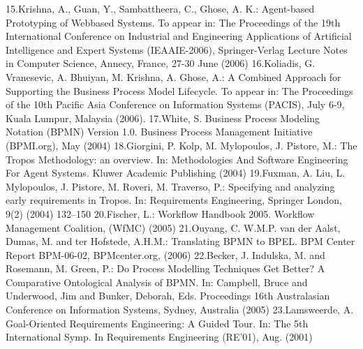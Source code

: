 15.Krishna, A., Guan, Y., Sambattheera, C., Ghose, A. K.: Agent-based Prototyping of Webbased Systems. To appear in: The Proceedings of the 19th International Conference on Industrial and Engineering Applications of Artificial Intelligence and Expert Systems (IEAAIE-2006), Springer-Verlag Lecture Notes in Computer Science, Annecy, France, 27-30
June (2006)
16.Koliadis, G. Vranesevic, A. Bhuiyan, M. Krishna, A. Ghose, A.: A Combined Approach for
Supporting the Business Process Model Lifecycle. To appear in: The Proceedings of the
10th Pacific Asia Conference on Information Systems (PACIS), July 6-9, Kuala Lumpur,
Malaysia (2006).
17.White, S. Business Process Modeling Notation (BPMN) Version 1.0. Business Process
Management Initiative (BPMI.org), May (2004)
18.Giorgini, P. Kolp, M. Mylopoulos, J. Pistore, M.: The Tropos Methodology: an overview.
In: Methodologies And Software Engineering For Agent Systems. Kluwer Academic Publishing (2004)
19.Fuxman, A. Liu, L. Mylopoulos, J. Pistore, M. Roveri, M. Traverso, P.: Specifying and
analyzing early requirements in Tropos. In: Requirements Engineering, Springer London,
9(2) (2004) 132–150
20.Fischer, L.: Workflow Handbook 2005. Workflow Management Coalition, (WfMC) (2005)
21.Ouyang, C. W.M.P. van der Aalst, Dumas, M. and ter Hofstede, A.H.M.: Translating
BPMN to BPEL. BPM Center Report BPM-06-02, BPMcenter.org, (2006)
22.Becker, J. Indulska, M. and Rosemann, M. Green, P.: Do Process Modelling Techniques
Get Better? A Comparative Ontological Analysis of BPMN. In: Campbell, Bruce and Underwood, Jim and Bunker, Deborah, Eds. Proceedings 16th Australasian Conference on
Information Systems, Sydney, Australia (2005)
23.Lamsweerde, A. Goal-Oriented Requirements Engineering: A Guided Tour. In: The 5th
International Symp. In Requirements Engineering (RE’01), Aug. (2001)